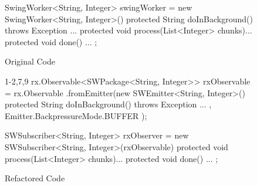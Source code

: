 \begin{figure}[H]
\begin{minipage}{0.48\textwidth}
\begin{sourcecode}
\begin{javacode}{1}
SwingWorker<String, Integer> swingWorker = new SwingWorker<String, Integer>() {
	protected String doInBackground() throws Exception {
		...
	}
	protected void process(List<Integer> chunks){...}
	protected void done() {...}
};
\end{javacode}
\caption{Original Code}
\label{code:limitation-original}
\end{sourcecode}
\end{minipage}\hspace{0.7cm}
\begin{minipage}{0.48\textwidth}
\begin{sourcecode}
\begin{javacode}{1-2,7,9}
rx.Observable<SWPackage<String, Integer>> rxObservable = rx.Observable
		.fromEmitter(new SWEmitter<String, Integer>() {
			protected String doInBackground() 
			throws Exception {
				...
			}
}, Emitter.BackpressureMode.BUFFER );

SWSubscriber<String, Integer> rxObserver = new SWSubscriber<String, Integer>(rxObservable) {
	protected void process(List<Integer> chunks){...}
	protected void done() {...}
};
\end{javacode}
\caption{Refactored Code}
\label{code:limitation-refactored}
\end{sourcecode}
\end{minipage}
\end{figure}